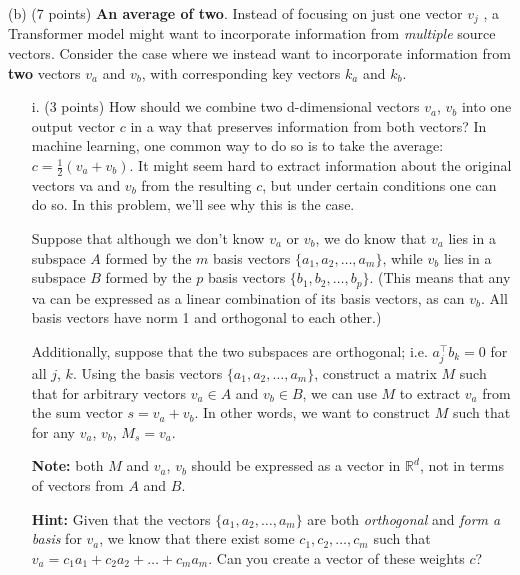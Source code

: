 \documentclass[letterpaper,12pt]{article}
\begin{document}
	\noindent(b) (7 points) \textbf{An average of two}. Instead of focusing on just one vector $v_j$ , a Transformer model might want to incorporate information from \textit{multiple} source vectors. Consider the case where we instead want to incorporate information from \textbf{two} vectors $v_a$ and $v_b$, with corresponding key vectors $k_a$ and $k_b$.
	
	\begin{itemize}
	\item [i.]
	(3 points) How should we combine two d-dimensional vectors $v_a$, $v_b$ into one output vector $c$ in a way that preserves information from both vectors? In machine learning, one common way to do so is to take the average:  $c = \frac{1}{2}(v_a + v_b)$. It might seem hard to extract information about the original vectors va and $v_b$ from the resulting $c$, but under certain conditions one can do so.
	In this problem, we'll see why this is the case.
			
	\vspace{1em}
			
	Suppose that although we don't know $v_a$ or $v_b$, we do know that $v_a$ lies in a subspace $A$ formed by the $m$ basis vectors $\{a_1, a_2, \ldots , a_m\}$, while $v_b$ lies in a subspace $B$ formed by the $p$ basis vectors $\{b_1, b_2, \ldots , b_p\}$. (This means that any va can be expressed as a linear combination of its basis vectors, as can $v_b$. All basis vectors have norm 1 and orthogonal to each other.)
			
	Additionally, suppose that the two subspaces are orthogonal; i.e. $a^\top_j b_k = 0$ for all $j$, $k$.
	Using the basis vectors $\{a_1, a_2, \ldots , a_m\}$, construct a matrix $M$ such that for arbitrary vectors $v_a \in A$ and $v_b \in B$, we can use $M$ to extract $v_a$ from the sum vector $s = v_a + v_b$. In other words, we want to construct $M$ such that for any $v_a$, $v_b$, $M_s = v_a$.
			
	\textbf{Note:} both $M$ and $v_a$, $v_b$ should be expressed as a vector in $\mathbb{R}^d$, not in terms of vectors from $A$ and $B$.
			
	\textbf{Hint:} Given that the vectors $\{a_1, a_2, \ldots , a_m\}$ are both \textit{orthogonal} and \textit{form a basis} for $v_a$, we know that there exist some $c_1, c_2, \ldots , c_m$ such that $v_a = c_1a_1 + c_2a_2 + \ldots + c_ma_m$. Can you create a vector of these weights $c$?
			

\end{itemize}
\end{document}
